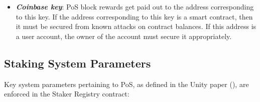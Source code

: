 \begin{itemize}
    \item \textbf{\textit{Coinbase key}}: PoS block rewards get paid out to the address corresponding to this key. If the address corresponding to this key is a smart contract, then it must be secured from known attacks on contract balances. If this address is a user account, the owner of the account must secure it appropriately.
\end{itemize}

\clearpage
\subsection{Staking System Parameters} \label{parameters_staker_registry}

Key system parameters pertaining to PoS, as defined in the Unity paper (\cite{WZS19}), are enforced in the Staker Registry contract: 

